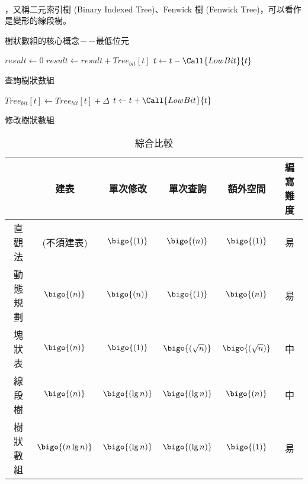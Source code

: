 \documentclass[12pt,a4paper,oneside]{report}
\begin{document}
\begin{CJK}{UTF8}{bkai}
\paragraph{}，又稱二元索引樹 (Binary Indexed Tree)、Fenwick 樹 (Fenwick Tree)，可以看作是變形的線段樹。

\begin{algorithm}[h]
\begin{algorithmic}[1]
  \State {}
\EndFunction
\end{algorithmic}
\caption{樹狀數組的核心概念－－最低位元}
\label{tree:alg:bit:lowbit}
\end{algorithm}

\begin{algorithm}[h]
\begin{algorithmic}[1]
  \State $result\gets{0}$
    \State $result\gets{result+Tree_{bit}[t]}$
    \State $t\gets{t-\Call{LowBit}{t}}$
  \EndWhile
  \State {}
\EndFunction
\end{algorithmic}
\caption{查詢樹狀數組}
\label{tree:alg:bit:query}
\end{algorithm}

\begin{algorithm}[h]
\begin{algorithmic}[1]
    \State $Tree_{bit}[t]\gets{Tree_{bit}[t]+\Delta}$
    \State $t\gets{t+\Call{LowBit}{t}}$
  \EndWhile
\EndFunction
\end{algorithmic}
\caption{修改樹狀數組}
\label{tree:alg:bit:modify}
\end{algorithm}

\begin{table}[h]
\centering
\begin{tabular}{c|ccccc}
& 建表 & 單次修改 & 單次查詢 & 額外空間 & 編寫難度\\
\hline
\hline
直觀法 & (不須建表) & $\bigo{(1)}$ & $\bigo{(n)}$ & $\bigo{(1)}$ & 易\\
動態規劃 & $\bigo{(n)}$ & $\bigo{(n)}$ & $\bigo{(1)}$ & $\bigo{(n)}$ & 易\\
塊狀表 & $\bigo{(n)}$ & $\bigo{(1)}$ & $\bigo{(\sqrt{n})}$ & $\bigo{(\sqrt{n})}$ & 中\\
線段樹 & $\bigo{(n)}$ & $\bigo{(\lg{n})}$ & $\bigo{(\lg{n})}$ & $\bigo{(n)}$ & 中\\
樹狀數組 & $\bigo{(n\lg{n})}$ & $\bigo{(\lg{n})}$ & $\bigo{(\lg{n})}$ & $\bigo{(1)}$ & 易\\
\end{tabular}
\caption{綜合比較}
\label{tree:tab:rsq:total:time}
\end{table}


\end{CJK}
\end{document}

